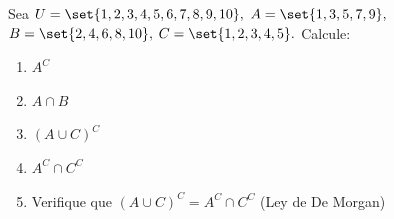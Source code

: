 \begin{problema}
	Sea $U = \set{1,2,3,4,5,6,7,8,9,10},$ $A = \set{1,3,5,7,9},$ $B = \set{2,4,6,8,10},$ $C = \set{1,2,3,4,5}.$ Calcule:
	\begin{enumerate}
		\item $A^{C}$
		\item $A \cap B$
		\item $(A \cup C)^{C}$
		\item $A^{C} \cap C^{C}$
		\item Verifique que $(A \cup C)^{C} = A^{C} \cap C^{C}$ (Ley de De Morgan)
	\end{enumerate}
\end{problema}
